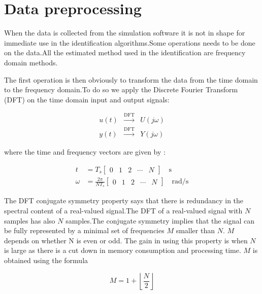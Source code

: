 \documentclass[a4paper,12pt]{report}
\numberwithin{equation}{section}
\begin{document}
\section{Data preprocessing}
When the data is collected from the simulation software it is not in shape for immediate use in the identification algorithms.Some operations needs to be done on the data.All the estimated method used in the identification are frequency domain methods.

The first operation is then obviously to transform the data from the time domain to the frequency domain.To do so we apply the  Discrete Fourier Transform (DFT) on the time domain input and output signals:

\begin{equation}
\begin{array}{rll}
u(t) & \stackrel{\mathrm{DFT}}{\longrightarrow} & U(j \omega) \\
y(t) & \stackrel{\mathrm{DFT}}{\longrightarrow} & Y(j \omega)
\end{array}
\end{equation}

\noindent
where the time and frequency vectors are given by :

\begin{equation}
\begin{aligned}
t &=T_{s}\left[\begin{array}{lllll}
0 & 1 & 2 & \cdots & N
\end{array}\right] \quad \mathrm{s} \\
\omega &=\frac{2 \pi}{N T_{s}}\left[\begin{array}{lllll}
0 & 1 & 2 & \cdots & N
\end{array}\right] \quad \mathrm{rad} / \mathrm{s}
\end{aligned}
\end{equation}

The DFT conjugate symmetry property says that there is redundancy in the spectral content of a real-valued signal.The DFT of a  real-valued signal with $N$ samples has also $N$ samples.The conjugate symmetry implies that  the signal can be fully represented by a minimal set of frequencies $M$ smaller than $N$. $M$ depends on whether N is even or odd. The gain in using this property is when $N$ is large as there is a cut down in memory consumption and processing time. $M$ is obtained using the formula 

\begin{equation}
M=1+\left\lfloor\frac{N}{2}\right\rfloor   
\end{equation}
\end{document}
